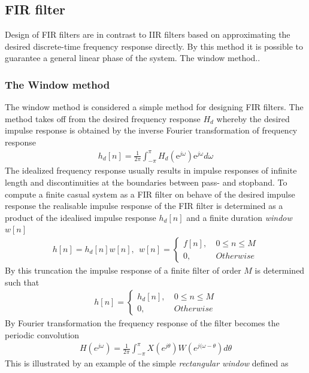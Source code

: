 \subsection{FIR filter}
Design of FIR filters are in contrast to IIR filters based on approximating the desired discrete-time frequency response directly. By this method it is possible to guarantee a general linear phase of the system. The window method..   

\subsubsection{The Window method}
The window method is considered a simple method for designing FIR filters. The method takes off from the desired frequency response $H_d$ whereby the desired impulse response is obtained by the inverse Fourier transformation of frequency response
\begin{align}
h_d[n]=\frac{1}{2\pi}\int_{-\pi}^{\pi} H_d(\text{e}^{j\omega})\text{e}^{j\omega} d\omega
\end{align}
The idealized frequency response usually results in impulse responses of infinite length and discontinuities at the boundaries between pass- and stopband. To compute a finite casual system as a FIR filter on behave of the desired impulse response the realisable impulse response of the FIR filter is determined as a product of the idealised impulse response $h_d[n]$ and a finite duration \textit{window} $w[n]$ 
\begin{align}
h[n]=h_d[n]w[n], \ \ w[n] =
\left\{ \begin{matrix}
f[n], &\ 0 \leq n \leq M \\
0, &\ Otherwise
\end{matrix}\right.
\end{align}       
By this truncation the impulse response of a finite filter of order $M$ is determined such that
\begin{align}
h[n]= 
\left\{ \begin{matrix}
h_d[n], &\ 0 \leq n \leq M \\
0, &\ Otherwise
\end{matrix}\right.
\end{align}
By Fourier transformation the frequency response of the filter becomes the periodic convolution 
\begin{align}
H(e^{j\omega})=\frac{1}{2\pi}\int_{-\pi}^{\pi} X(e^{j\theta})W(e^{j(\omega-\theta})d\theta
\end{align} 
This is illustrated by an example of the simple \textit{rectangular window} defined as 
